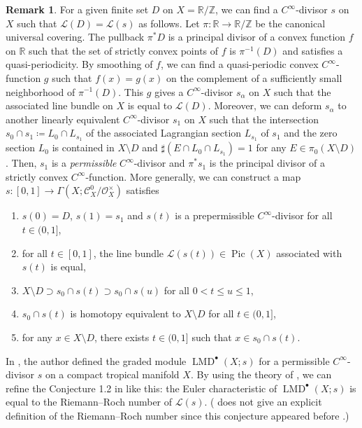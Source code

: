 \documentclass[a4paper,dvipdfmx,reqno,12pt]{amsart}
\theoremstyle{definition}
\newtheorem{remark}[theorem]{Remark}
\newcommand{\deq}{\coloneqq}
\newcommand{\opn}[1]{\operatorname{#1}}
\numberwithin{equation}{section}
\begin{document}
\begin{remark}
For a given finite set $D$ on
$X=\mathbb{R}/\mathbb{Z}$,
we can find a $C^{\infty}$-divisor $s$ on $X$
such that $\mathcal{L}(D)=\mathcal{L}(s)$ as follows.
Let $\pi\colon \mathbb{R}\to \mathbb{R}/\mathbb{Z}$
be the canonical universal covering.
The pullback $\pi^* D$ is a principal divisor 
of a convex function $f$ on $\mathbb{R}$ such that 
the set of strictly convex points of $f$ is $\pi^{-1}(D)$
and satisfies a quasi-periodicity.
By smoothing of $f$, we can find a quasi-periodic
convex $C^{\infty}$-function $g$ such that $f(x)=g(x)$ on 
the complement of a sufficiently 
small neighborhood of $\pi^{-1}(D)$. 
This $g$ gives a $C^{\infty}$-divisor $s_{\alpha}$ on
$X$ such that the associated line bundle on $X$ is equal
to $\mathcal{L}(D)$.
Moreover, we can deform $s_{\alpha}$ to another 
linearly equivalent 
$C^{\infty}$-divisor $s_{1}$ on $X$ such that 
the intersection $s_0\cap s_{1}\deq 
L_{0}\cap L_{s_{1}}$ of the associated 
Lagrangian section $L_{s_{1}}$
of $s_{1}$ and the zero section $L_0$ is contained in 
$X\setminus D$ and $\sharp (E\cap L_{0}\cap L_{s_{1}})=1$
for any $E\in \pi_0(X\setminus D)$.
Then, $s_{1}$ is a \emph{permissible} 
$C^{\infty}$-divisor and $\pi^{*}s_{1}$ is the 
principal divisor of a strictly convex
$C^{\infty}$-function.
More generally,
we can construct a map $s\colon [0,1]\to 
\Gamma (X;\mathcal{C}^{0}_X/\mathcal{O}_X^{\times})$ satisfies
\begin{enumerate}
\item $s(0)=D$, $s(1)=s_1$ and 
$s(t)$ is a prepermissible $C^{\infty}$-divisor
for all $t\in (0,1]$,
\item for all $t\in [0,1]$, the line bundle
$\mathcal{L}(s(t))\in \opn{Pic}(X)$ associated with
$s(t)$ is equal,
\item $X\setminus D\supset s_0\cap 
s(t)\supset s_0\cap s(u)$ for all $0<t\leq u \leq 1$,
\item $s_0\cap s(t)$ is homotopy equivalent to $X\setminus D$
for all $t\in (0,1]$,
\item for any $x\in X\setminus D$, there exists $t\in (0,1]$
such that $x\in s_0\cap s(t)$. 
\end{enumerate}

In \cite{tsutsui2023graded}, the author
defined the graded module $\opn{LMD}^{\bullet}(X;s)$
for a permissible $C^{\infty}$-divisor $s$ on
a compact tropical manifold $X$.
By using the theory of \cite{demedrano2023chern},
we can refine the Conjecture 1.2 in 
\cite{tsutsui2023graded}
like this: the Euler characteristic of
$\opn{LMD}^{\bullet}(X;s)$ 
is equal to the Riemann--Roch number of 
$\mathcal{L}(s)$.
(\cite[Conjecture 1.2]{tsutsui2023graded} does not
give an explicit definition of the Riemann--Roch number
since this conjecture appeared before
\cite{demedrano2023chern}.)


\end{remark}
\end{document}
